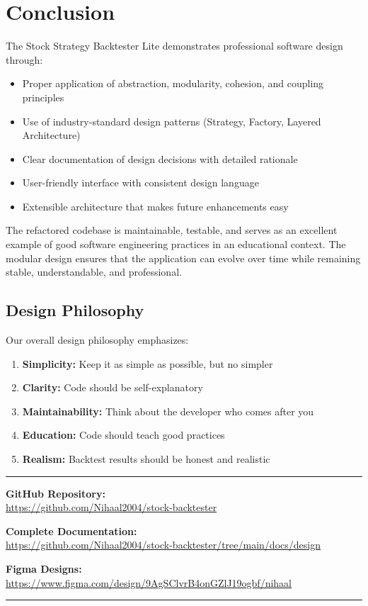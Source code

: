 \documentclass[11pt,a4paper]{article}
\begin{document}
\newpage
\section{Conclusion}

The Stock Strategy Backtester Lite demonstrates professional software design through:

\begin{itemize}
    \item Proper application of abstraction, modularity, cohesion, and coupling principles
    \item Use of industry-standard design patterns (Strategy, Factory, Layered Architecture)
    \item Clear documentation of design decisions with detailed rationale
    \item User-friendly interface with consistent design language
    \item Extensible architecture that makes future enhancements easy
\end{itemize}

The refactored codebase is maintainable, testable, and serves as an excellent example of good software engineering practices in an educational context. The modular design ensures that the application can evolve over time while remaining stable, understandable, and professional.

\vspace{1cm}

\subsection{Design Philosophy}

Our overall design philosophy emphasizes:
\begin{enumerate}[noitemsep]
    \item \textbf{Simplicity:} Keep it as simple as possible, but no simpler
    \item \textbf{Clarity:} Code should be self-explanatory
    \item \textbf{Maintainability:} Think about the developer who comes after you
    \item \textbf{Education:} Code should teach good practices
    \item \textbf{Realism:} Backtest results should be honest and realistic
\end{enumerate}

\vspace{2cm}

\begin{center}
\rule{0.5\textwidth}{0.4pt}

\textbf{GitHub Repository:} \\
\url{https://github.com/Nihaal2004/stock-backtester}

\textbf{Complete Documentation:} \\
\url{https://github.com/Nihaal2004/stock-backtester/tree/main/docs/design}

\textbf{Figma Designs:} \\
\url{https://www.figma.com/design/9AgSClvrB4onGZlJ19ogbf/nihaal}

\rule{0.5\textwidth}{0.4pt}
\end{center}
\end{document}
